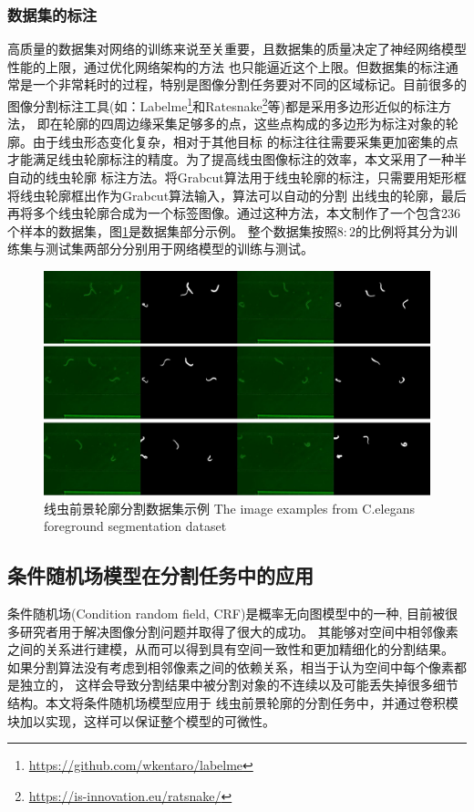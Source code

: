 \subsubsection{数据集的标注}
	高质量的数据集对网络的训练来说至关重要，且数据集的质量决定了神经网络模型性能的上限，通过优化网络架构的方法
	也只能逼近这个上限。但数据集的标注通常是一个非常耗时的过程，特别是图像分割任务要对不同的区域标记。目前很多的
	图像分割标注工具(如：Labelme\footnote{\url{https://github.com/wkentaro/labelme}}和Ratesnake\footnote{\url{https://is-innovation.eu/ratsnake/}}等)都是采用多边形近似的标注方法，
	即在轮廓的四周边缘采集足够多的点，这些点构成的多边形为标注对象的轮廓。由于线虫形态变化复杂，相对于其他目标
	的标注往往需要采集更加密集的点才能满足线虫轮廓标注的精度。为了提高线虫图像标注的效率，本文采用了一种半自动的线虫轮廓
	标注方法。将Grabcut算法用于线虫轮廓的标注，只需要用矩形框将线虫轮廓框出作为Grabcut算法输入，算法可以自动的分割
	出线虫的轮廓，最后再将多个线虫轮廓合成为一个标签图像。通过这种方法，本文制作了一个包含236个样本的数据集，图\ref{fig:dataset}是数据集部分示例。
	整个数据集按照$8:2$的比例将其分为训练集与测试集两部分分别用于网络模型的训练与测试。
	\begin{figure}[h]
	  \centering
	  \includegraphics[width=14cm]{figure/chap3/dataset.jpg}
	  \bicaption
		{线虫前景轮廓分割数据集示例}
		{The image examples from C.elegans foreground segmentation dataset}
	  \label{fig:dataset}
	\end{figure}
\subsection{条件随机场模型在分割任务中的应用}
	条件随机场(Condition random field, CRF)是概率无向图模型中的一种\cite{李航2012统计学习方法},
	目前被很多研究者用于解决图像分割问题并取得了很大的成功\cite{zheng2015conditional,wang2017adaptive,chen2018deeplab}。
	其能够对空间中相邻像素之间的关系进行建模，从而可以得到具有空间一致性和更加精细化的分割结果。
	如果分割算法没有考虑到相邻像素之间的依赖关系，相当于认为空间中每个像素都是独立的，
	这样会导致分割结果中被分割对象的不连续以及可能丢失掉很多细节结构。本文将条件随机场模型应用于
	线虫前景轮廓的分割任务中，并通过卷积模块加以实现，这样可以保证整个模型的可微性。
		
